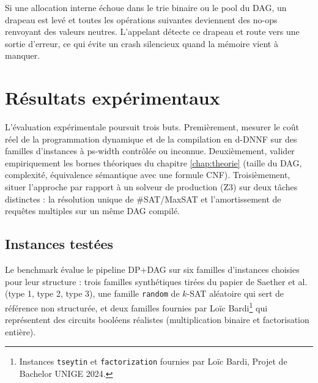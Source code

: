\documentclass[11pt,a4paper]{report}
\theoremstyle{plain}
\theoremstyle{definition}
\begin{document}
Si une allocation interne échoue dans le trie binaire ou le pool du
DAG, un drapeau est levé et toutes les opérations suivantes
deviennent des no-ops renvoyant des valeurs neutres. L'appelant
détecte ce drapeau et route vers une sortie d'erreur, ce qui évite
un crash silencieux quand la mémoire vient à manquer.


\chapter{Résultats expérimentaux}
\label{chap:resultats}


L'évaluation expérimentale poursuit trois buts. Premièrement, mesurer
le coût réel de la programmation dynamique et de la compilation en
d-DNNF sur des familles d'instances à ps-width contrôlée ou inconnue.
Deuxièmement, valider empiriquement les bornes théoriques du
chapitre \ref{chap:theorie} (taille du DAG, complexité, équivalence
sémantique avec une formule CNF). Troisièmement, situer l'approche
par rapport à un solveur de production (Z3) sur deux tâches
distinctes : la résolution unique de \#SAT/MaxSAT et l'amortissement
de requêtes multiples sur un même DAG compilé.

\section{Instances testées}
\label{sec:res-instances}

Le benchmark évalue le pipeline DP+DAG sur six familles d'instances
choisies pour leur structure : trois familles synthétiques tirées du
papier de Saether et al. \cite{saether2015} (type 1, type 2, type 3),
une famille \texttt{random} de $k$-SAT aléatoire qui sert de
référence non structurée, et deux familles fournies par Loïc
Bardi\footnote{Instances \texttt{tseytin} et \texttt{factorization}
fournies par Loïc Bardi, Projet de Bachelor UNIGE 2024.} qui
représentent des circuits booléens réalistes (multiplication
binaire et factorisation entière).
\end{document}
